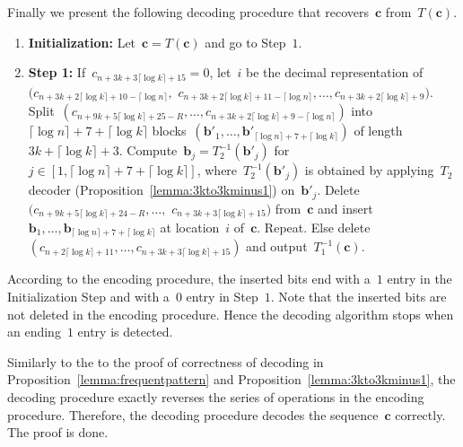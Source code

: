 \documentclass[10pt,a4paper,onecolumn]{IEEEtran}
\newcommand{\1}{\mathbbold{1}}
\newcommand{\boldb}{\mathbf{b}}
\newcommand{\boldc}{\mathbf{c}}
\begin{document}
Finally we present the following decoding procedure that recovers~$\boldc$ from~$T(\boldc)$.
\begin{enumerate}
    \item \textbf{Initialization:} Let~$\boldc=T(\boldc)$ and go to Step~$1$. 
    \item \textbf{Step 1:} If~$c_{n+3k+3\lceil\log k\rceil+15}=0$, let~$i$ be the decimal representation of~$(c_{n+3k+2\lceil\log k\rceil+10-\lceil \log n\rceil},$
    \newline
    $c_{n+3k+2\lceil\log k\rceil+11-\lceil \log n\rceil},\ldots,c_{n+3k+2\lceil\log k\rceil+9})$. Split~$(c_{n+9k+5\lceil\log k\rceil+25-R},\ldots,c_{n+3k+2\lceil\log k\rceil+9-\lceil \log n\rceil})$ into 
    \newline
    $\lceil \log n\rceil+7+\lceil\log k\rceil$ blocks~$(\boldb'_1,\ldots,\boldb'_{\lceil \log n\rceil+7+\lceil\log k\rceil})$ of length~$3k+\lceil\log k\rceil+3$. Compute~$\boldb_j=T^{-1}_2(\boldb'_j)$ for~$j\in [1,\lceil \log n\rceil+7+\lceil\log k\rceil]$, where~$T^{-1}_2(\boldb'_j)$ is obtained by applying~$T_2$ decoder (Proposition~\ref{lemma:3kto3kminus1}) on~$\boldb'_j$.
    Delete \newline 
    $(c_{n+9k+5\lceil\log k\rceil+24-R},\ldots,$ $c_{n+3k+3\lceil\log k\rceil+15})$ from~$\boldc$ and insert~$\boldb_1,\ldots,\boldb_{\lceil \log n\rceil+7+\lceil\log k\rceil}$ at location~$i$ of~$\boldc$.
    Repeat. 
    Else delete~$(c_{n+2\lceil\log k\rceil+11},\ldots,c_{n+3k+3\lceil\log k\rceil+15})$ and output~$T^{-1}_1(\boldc)$.
\end{enumerate}
According to the encoding procedure, the inserted bits end with a~$1$ entry in the Initialization Step and with a~$0$ entry in Step~$1$. Note that the inserted bits are not deleted in the encoding procedure. Hence the decoding algorithm stops when an ending~$1$ entry is detected.

Similarly to the 
to the proof of correctness of decoding in Proposition~\ref{lemma:frequentpattern} and Proposition~\ref{lemma:3kto3kminus1}, the decoding procedure exactly reverses the series of operations in the encoding procedure. Therefore, the decoding procedure decodes the sequence~$\boldc$ correctly. The proof is done.
\end{document}
